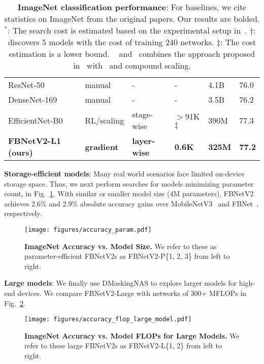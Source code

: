 \documentclass[10pt,twocolumn,letterpaper]{article}
\begin{document}
\begin{table*}[t]
\begin{tabular*}{\textwidth}{l @{\extracolsep{\fill}} lllll}
ResNet-50~\cite{resnet} & manual & - & - & 4.1B & 76.0 \\
DenseNet-169~\cite{densenet} & manual & - & - & 3.5B & 76.2 \\
EfficientNet-B0~\cite{efficientnet} & RL/scaling & stage-wise & $>$91K$\ddag$ & 390M & 77.3 \\
\textbf{FBNetV2-L1 (ours)} & \textbf{gradient} & \textbf{layer-wise} & \textbf{0.6K} & \textbf{325M} & \textbf{77.2} \\ \bottomrule
\end{tabular*}
\caption{\small{\textbf{ImageNet classification performance}: For baselines, we cite statistics on ImageNet from the original papers. Our results are bolded. $^*$: The search cost is estimated based on the experimental setup in~\cite{mnasnet}.  $\dag$:~\cite{chamnet} discovers 5 models with the cost of training 240 networks. $\ddag$: The cost estimation is a lower bound. ~\cite{mobilenetv3} and~\cite{efficientnet} combines the approach proposed in~\cite{mnasnet} with~\cite{netadapt} and compound scaling.}}
\label{tab:imagenet}

\end{table*}

\textbf{Storage-efficient models}: 
Many real world scenarios face limited on-device storage space. Thus, we next perform searches for models minimizing parameter count, in Fig.~\ref{fig:results-param-efficient}. With similar or smaller model size (4M parameters), FBNetV2 achieves 2.6\% and 2.9\% absolute accuracy gains over MobileNetV3~\cite{mobilenetv3} and FBNet~\cite{fbnet}, respectively.

\begin{figure}
    \centering
    \texttt{[image: figures/accuracy\_param.pdf]}
    \caption{\textbf{ImageNet Accuracy vs. Model Size.} We refer to these as parameter-efficient FBNetV2s as FBNetV2-P\{1, 2, 3\} from left to right.}
    \label{fig:results-param-efficient}
\end{figure}

\textbf{Large models}: 
We finally use DMaskingNAS to explore larger models for high-end devices. We compare FBNetV2-Large with networks of 300+ MFLOPs in Fig.~\ref{fig:results-large}.

\begin{figure}
    \centering
    \texttt{[image: figures/accuracy\_flop\_large\_model.pdf]}
    \caption{\textbf{ImageNet Accuracy vs. Model FLOPs for Large Models.} We refer to these large FBNetV2s as FBNetV2-L\{1, 2\} from left to right.}
    \label{fig:results-large}
\end{figure}
\end{document}
